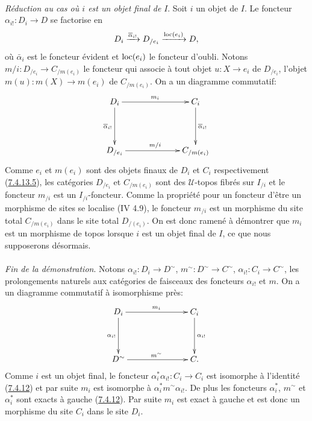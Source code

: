 \documentclass[10pt]{../fichiers-configuration-latex/smfart}
\begin{document}
\paragraph{}
\emph{Réduction au cas où $i$ est un objet final de} $I$. Soit $i$ un objet
de $I$. Le foncteur $\alpha_{i!} : D_i \to D$ se factorise en
$$
D_i \xrightarrow{\overline{\alpha}_{i!}} D_{/e_i} \xrightarrow{\operatorname{loc}(e_i)} D{},
$$
où $\bar{\alpha}_{i}$ est le foncteur évident et $\operatorname{loc}(e_i)$ le
  foncteur d'oubli. Notons $m/i : D_{/e_i} \to C_{/m(e_i)}$ le foncteur
  qui associe à tout objet $u : X \to e_i$ de $D_{/e_i}$, l'objet
  $m(u) : m(X) \to m(e_i)$ de $C_{/m(e_i)}$. On a un diagramme
  commutatif:
\[
\xymatrix@C=2.25cm@R=1.5cm{
D_i \ar[r]^{m_i} \ar[d]_{\bar{\alpha}_{i!}}& C_i\ar[d]^{\bar{\alpha}_{i!}}\\
D_{/e_i}  \ar[r]^{m/i} & C_{/m(e_i)}
}
\]
Comme $e_i$ et $m(e_i)$ sont des objets finaux de $D_i$ et $C_i$
respectivement (\hyperref[VI.par7.4.13.5]{7.4.13.5}), les catégories $D_{/e_{i}}$
et $C_{/m(e_i)}$ sont des $𝒰$-topos fibrés sur $I_{/i}$ et
le foncteur $m_{/i}$ est un $I_{/i}$-foncteur. Comme la propriété
pour un foncteur d'être un morphisme de sites se localise (IV 4.9),
le foncteur $m_{/i}$ est un morphisme du site total $C_{/m(e_i)}$
dans le site total $D_{/(e_i)}$. On est donc ramené à démontrer que
$m_i$ est un morphisme de topos lorsque $i$ est un objet final de
$I$, ce que nous supposerons désormais.\pageoriginale

\paragraph{}
\emph{Fin de la démonstration}. Notons $\alpha_{i!} : D_i \to
D^{\sim}$, $m^{\sim} : D^{\sim} \to C^{\sim}$, $\alpha_{i!} : C_i \to
C^{\sim}$, les prolongements naturels aux catégories de faisceaux des
  foncteurs $\alpha_{i!}$ et $m$. On a un diagramme commutatif à
  isomorphisme près:
\[
\xymatrix@C=2.5cm@R=1.5cm{
D_i \ar[r]^{m_i} \ar[d]_{\alpha_{i!}}& C_i\ar[d]^{\alpha_{i!}}\\
D^{\sim}  \ar[r]^{m^{\sim}} & C .
}
\]
Comme $i$ est un objet final, le foncteur $\alpha^{\ast}_i \alpha_{i!} :
C_i \to C_i$ est isomorphe à l'identité (\hyperref[VI.lem7.4.12]{7.4.12}) et par suite $m_i$
est isomorphe à $\alpha^{\ast}_i m^{\sim} \alpha_{i!}$. De plus les
foncteurs $\alpha^{\ast}_i$, $m^{\sim}$ et $\alpha^{\ast}_i$ sont exacts à
gauche (\hyperref[VI.lem7.4.12]{7.4.12}). Par suite $m_i$ est exact à gauche et est donc un
morphisme du site $C_i$ dans le site $D_i$.
\end{document}
